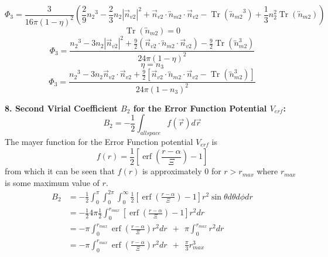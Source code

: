 \documentclass[12pt]{article}
\begin{document}
\[{}\]
\begin{equation}{\Phi_3=\frac{3}{16\pi(1-\eta)^2}\left(\frac{2}{9}{n_2}^3-\frac{2}{3}n_2|\vec{n}_{v2}|^2+\vec{n}_{v2}\cdot{\overleftrightarrow{n}_{m2}}\cdot{\vec{n}_{v2}}-\operatorname{Tr}({\overleftrightarrow{n}_{m2}}^3)+\frac{1}{3}n^2_2\operatorname{Tr}(\overleftrightarrow{n}_{m2})\right)}\end{equation} 
\[{}\]
\begin{equation}{\operatorname{Tr}(\overleftrightarrow{n}_{m2})=0}\end{equation} 
\[{}\]
\begin{equation}{\Phi_3=\frac{{n_2}^3-3n_2|\vec{n}_{v2}|^2+\frac{9}{2}(\vec{n}_{v2}\cdot{\overleftrightarrow{n}_{m2}}\cdot{\vec{n}_{v2}})-\frac{9}{2}\operatorname{Tr}({\overleftrightarrow{n}^3_{m2}})}{24\pi(1-\eta)^2}}\end{equation} 
\[{}\]
\begin{equation}{\eta=n_3}\end{equation} 
\[{}\]
\begin{equation}{\Phi_3=\frac{{n_2}^3-3n_2\vec{n}_{v2}\cdot\vec{n}_{v2}+\frac{9}{2}[\vec{n}_{v2}\cdot{\overleftrightarrow{n}_{m2}}\cdot{\vec{n}_{v2}}-\operatorname{Tr}({\overleftrightarrow{n}^3_{m2}})]}{24\pi(1-n_3)^2}}\end{equation} 
\[{}\]
\[{}\]


\textbf{8. Second Virial Coefficient $B_{2}$ for the Error Function Potential $V_{erf}$:}
\begin{equation}B_2=-\frac{1}{2}\int_{allspace}f(\vec{r})d\vec r\end{equation}
The mayer function for the Error Function potential $V_{erf}$ is
\begin{equation}f(r)=\frac{1}{2}\left[\operatorname{erf}\left(\frac{r-\alpha}{\Xi}\right)-1\right]\end{equation} from which it can be seen that $f(r)$ is approximately 0 for $r>r_{max}$ where $r_{max}$ is some maximum value of $r$.
\begin{align}
 B_2 &= -\frac{1}{2}\int_0^{\pi}\int_0^{2\pi}\int_0^\infty\frac{1}{2}\left[\operatorname{erf}\left(\frac{r-\alpha}{\Xi}\right)-1\right]r^2\sin{\theta}d{\theta}d{\phi}dr \\
     &= -\frac{1}{2}4\pi\frac{1}{2}\int_{0}^{r_{max}}\left[\operatorname{erf}\left(\frac{r-\alpha}{\Xi}\right)-1\right]r^2dr \\
     &= -\pi\int_{0}^{r_{max}}\operatorname{erf}\left(\frac{r-\alpha}{\Xi}\right)r^2dr {~~}+{~~} \pi\int_0^{r_{max}}r^2dr   \\
     &= -\pi\int_{0}^{r_{max}}\operatorname{erf}\left(\frac{r-\alpha}{\Xi}\right)r^2dr {~~}+{~~} \frac{\pi}{3}r_{max}^3   
\end{align}
\end{document}
